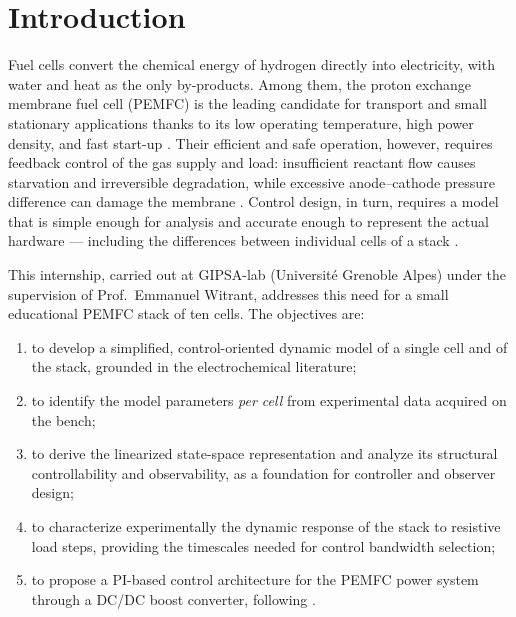 
\chapter{Introduction}

\label{Chapter1}

Fuel cells convert the chemical energy of hydrogen directly into electricity, with
water and heat as the only by-products. Among them, the proton exchange membrane
fuel cell (PEMFC) is the leading candidate for transport and small stationary
applications thanks to its low operating temperature, high power density, and fast
start-up \cite{pukrushpan2003,daud2017pem}. Their efficient and safe operation,
however, requires feedback control of the gas supply and load: insufficient
reactant flow causes starvation and irreversible degradation, while excessive
anode--cathode pressure difference can damage the membrane \cite{zhu2017,kharrat2025}.
Control design, in turn, requires a model that is simple enough for analysis and
accurate enough to represent the actual hardware --- including the differences
between individual cells of a stack \cite{manana2006}.

This internship, carried out at GIPSA-lab (Universit\'e Grenoble Alpes) under the
supervision of Prof.~Emmanuel Witrant, addresses this need for a small educational
PEMFC stack of ten cells. The objectives are:
\begin{enumerate}[label=\arabic*)]
    \item to develop a simplified, control-oriented dynamic model of a single cell
          and of the stack, grounded in the electrochemical literature;
    \item to identify the model parameters \emph{per cell} from experimental data
          acquired on the bench;
    \item to derive the linearized state-space representation and analyze its
          structural controllability and observability, as a foundation for
          controller and observer design;
    \item to characterize experimentally the dynamic response of the stack to
          resistive load steps, providing the timescales needed for control
          bandwidth selection;
    \item to propose a PI-based control architecture for the PEMFC power system
          through a DC/DC boost converter, following \cite{derbeli2017}.
\end{enumerate}

